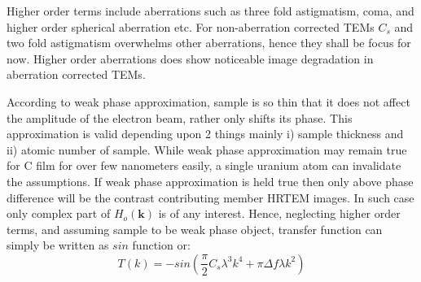 Higher order terms include aberrations such as three fold astigmatism, coma, and higher order spherical aberration etc.
For non-aberration corrected TEMs $C_s$ and two fold astigmatism overwhelms other aberrations, hence they shall be focus for now.
Higher order aberrations does show noticeable image degradation in aberration corrected TEMs.

According to weak phase approximation\cite{Scherzer1949}, sample is so thin that it does not affect the amplitude of the electron beam, rather only shifts its phase.
This approximation is valid depending upon 2 things mainly i) sample thickness and ii) atomic number of sample.
While weak phase approximation may remain true for C film for over few nanometers easily, a single uranium atom can invalidate the assumptions.
If weak phase approximation is held true then only above phase difference will be the contrast contributing member HRTEM images.
In such case only complex part of $H_o(\boldsymbol{k})$ is of any interest.
Hence, neglecting higher order terms, and assuming sample to be weak phase object, transfer function can simply be written as $sin$ function or:
\begin{equation}
    T(k) = -sin(\frac{\pi}{2}C_s \lambda^3 k^4 + \pi \Delta f \lambda k^2)
    \label{eq:ctf}
\end{equation}

